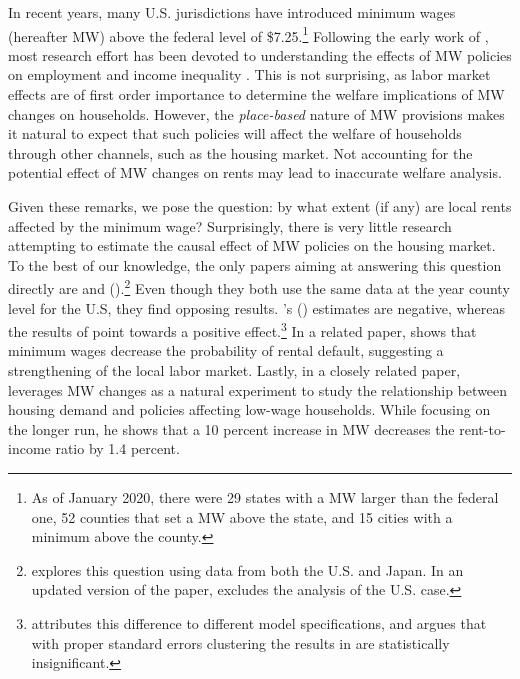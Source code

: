 
In recent years, many U.S. jurisdictions have introduced minimum wages (hereafter MW) above 
the federal level of \$7.25.\footnote{As of January 2020, there were 29 states with a MW 
	larger 	than the federal one, 52 counties that set a MW above the state, and 15 cities 
	with a minimum above the county.} %
Following the early work of \textcite{CardKrueger2000}, most research effort has been devoted 
to understanding the effects of MW policies on employment \parencite[e.g.,][]{Neumark2006, 
DubeEtAl2010, MeerWest2016, CegnizEtAl2019} and income inequality \parencite{Lee1999, 
AutorEtAl2016}. This is not surprising, as labor market effects are of first order importance 
to determine the welfare implications of MW changes on households. However, the 
\textit{place-based} nature of MW provisions makes it natural to expect that such policies 
will affect the welfare of households through other channels, such as the housing market.
Not accounting for the potential effect of MW changes on rents may lead to inaccurate 
welfare analysis.

Given these remarks, we pose the question: by what extent (if any) are local rents affected 
by the minimum wage? Surprisingly, there is very little research attempting to estimate 
the causal effect of MW policies on the housing market. To the best of our knowledge, the 
only papers aiming at answering this question directly are \textcite{Tidemann2018} and 
\citeauthor{Yamagishi2019} (\citeyear{Yamagishi2019, Yamagishi2020}).\footnote{
	\textcite{Yamagishi2019} explores this question using data from both the U.S. and Japan. 
	In an updated version of the paper, \textcite{Yamagishi2020} excludes the analysis of the 
	U.S. case.}
Even though they both use the same data at the year county level for the U.S, they find opposing 
results. \citeauthor{Tidemann2018}'s (\citeyear{Tidemann2018}) estimates are negative, whereas 
the results of \textcite{Yamagishi2019} point towards a positive effect.\footnote{
	\textcite{Yamagishi2019} attributes this difference to different model 
	specifications, and argues that with proper standard errors clustering the results in 
	\textcite{Tidemann2018} are statistically insignificant.} 
In a related paper, \textcite{AgarwalEtAl2019} shows that minimum wages decrease 
the probability of rental default, suggesting a strengthening of the local labor market. 
Lastly, in a closely related paper, \textcite{hughes2020housing} leverages MW changes as a 
natural experiment to study the relationship between housing demand and policies affecting 
low-wage households. While focusing on the longer run, he shows that a 10 percent 
increase in MW decreases the rent-to-income ratio by 1.4 percent. 

